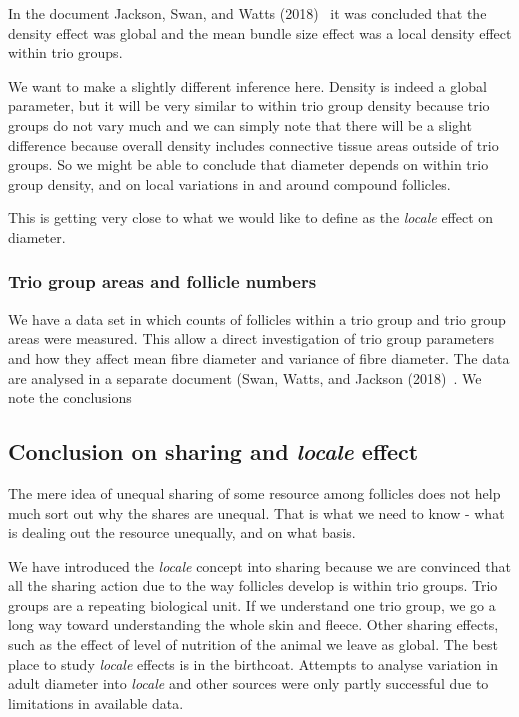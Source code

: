 \documentclass[titlepage]{article}  %
\begin{document}
In the document Jackson, Swan, and Watts (2018)~\cite{jack:18c}  it was concluded that the density effect was global and the mean bundle size effect was a local density effect within trio groups.

We want to make a slightly different inference here.  Density is indeed a global parameter, but it will be very similar to within trio group density because trio groups do not vary much and we can simply note that there will be a slight difference because overall density includes connective tissue areas outside of trio groups. So we might be able to conclude that diameter depends on within trio group density, and on local variations in and around compound follicles. 

This is getting very close to what we would like to define as the {\em locale} effect on diameter.

\subsubsection{Trio group areas and follicle numbers}
We have a data set in which counts of follicles within a trio group and trio group areas were measured. This allow a direct investigation of trio group parameters and how they affect mean fibre diameter and variance of fibre diameter. The data are analysed in a separate document (Swan, Watts, and Jackson (2018)~\cite{swan:18}. We note the conclusions


\subsection{Conclusion on sharing and {\em locale} effect}
The mere idea of unequal sharing of some resource among follicles does not help much sort out why the shares are unequal. That is what we need to know -  what is dealing out the resource unequally, and on what basis.

We have introduced the {\em locale} concept into sharing because we are convinced that all the sharing action due to the way follicles develop is within trio groups. Trio groups are a repeating biological unit. If we understand one trio group, we go a long way toward understanding the whole skin and fleece. Other sharing effects, such as the effect of level of nutrition of the animal we leave as global. The best place to study {\em locale} effects is in the birthcoat. Attempts to analyse variation in adult diameter into {\em locale} and other sources were only partly successful due to limitations in available data.
\end{document}
